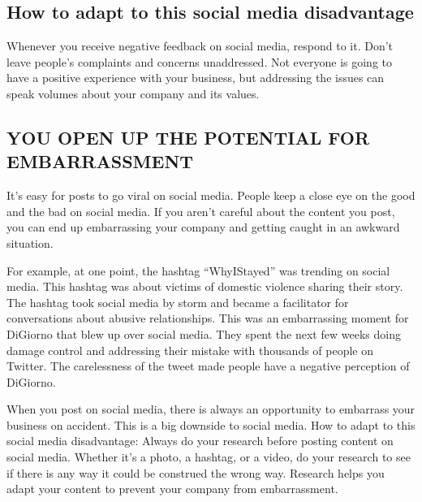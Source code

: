 \documentclass[a4paper]{article}
\begin{document}
  \subsection{How to adapt to this social media disadvantage}
  Whenever you receive negative feedback on social media, respond to it. Don’t leave people’s complaints and concerns unaddressed. Not everyone is going to have a positive experience with your business, but addressing the issues can speak volumes about your company and its values.
  \subsection{YOU OPEN UP THE POTENTIAL FOR EMBARRASSMENT}
  It’s easy for posts to go viral on social media. People keep a close eye on the good and the bad on social media. If you aren’t careful about the content you post, you can end up embarrassing your company and getting caught in an awkward situation.

For example, at one point, the hashtag “WhyIStayed” was trending on social media. This hashtag was about victims of domestic violence sharing their story. The hashtag took social media by storm and became a facilitator for conversations about abusive relationships.
This was an embarrassing moment for DiGiorno that blew up over social media. They spent the next few weeks doing damage control and addressing their mistake with thousands of people on Twitter. The carelessness of the tweet made people have a negative perception of DiGiorno.

When you post on social media, there is always an opportunity to embarrass your business on accident. This is a big downside to social media.
 How to adapt to this social media disadvantage: Always do your research before posting content on social media. Whether it’s a photo, a hashtag, or a video, do your research to see if there is any way it could be construed the wrong way. Research helps you adapt your content to prevent your company from embarrassment.
\end{document}
